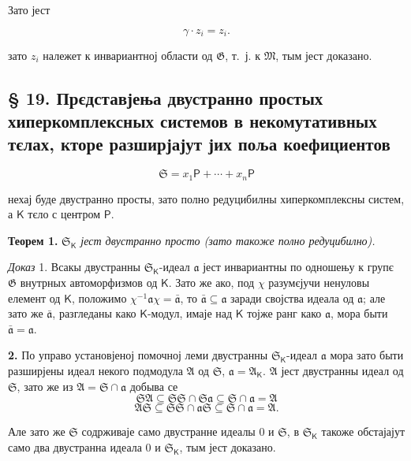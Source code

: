 \documentclass[11pt]{article}
\begin{document}
Зато јест

\[
\gamma\cdot z_i=z_i.
\]

зато \(z_i\) належет к инвариантној области од \(\mathfrak G\), т.~ј. к \(\mathfrak M\), тым јест доказано.

\subsection*{§ 19. Прєдставјења двустранно простых хиперкомплексных системов в некомутативных тєлах, кторе разширјајут јих поља коефициентов}\label{darstellungen-zweiseitig-einfacher-hyperkomplexer-systeme-in-nichtkommutativen-erweiterungskoerpern-ihrer-koeffizientenkoerper}

\[
\mathfrak S=x_1\mathsf P+\cdots+x_n\mathsf P
\]

нехај буде двустранно просты, зато полно редуцибилны хиперкомплексны систем, а \(\mathsf K\) тєло с центром \(\mathsf P\).

\textbf{Теорем 1.} \emph{\(\mathfrak S_{\mathsf K}\) јест двустранно просто (зато такоже полно редуцибилно).}

\emph{Доказ} 1. Всакы двустранны \(\mathfrak S_{\mathsf K}\)-идеал \(\mathfrak a\) јест инвариантны по одношењу к групє \(\mathfrak G\) внутрных автоморфизмов од \(\mathsf K\). Зато же ако, под \(\chi\) разумєјучи ненуловы елемент од \(\mathsf K\), положимо \(\chi^{-1}\mathfrak a\chi=\bar{\mathfrak a}\), то \(\bar{\mathfrak a}\subseteq\mathfrak a\) заради својства идеала од \(\mathfrak a\); але зато же \(\bar{\mathfrak a}\), разгледаны како \(\mathsf K\)-модул, имаје над \(\mathsf K\) тојже ранг како \(\mathfrak a\), мора быти \(\bar{\mathfrak a}=\mathfrak a\).

\textbf{2.} По управо установјеној помочној леми двустранны \(\mathfrak S_{\mathsf K}\)-идеал \(\mathfrak a\) мора зато быти разширјены идеал некого подмодула \(\mathfrak A\) од \(\mathfrak S\), \(\mathfrak a=\mathfrak A_{\mathsf K}\). \(\mathfrak A\) јест двустранны идеал од \(\mathfrak S\), зато же из \(\mathfrak A=\mathfrak S\cap\mathfrak a\) добыва се
\[
\mathfrak S\mathfrak A\subseteq\mathfrak S\mathfrak S\cap\mathfrak S\mathfrak a\subseteq\mathfrak S\cap\mathfrak a=\mathfrak A
\]
\[
\mathfrak A\mathfrak S\subseteq\mathfrak S\mathfrak S\cap\mathfrak a\mathfrak S\subseteq\mathfrak S\cap\mathfrak a=\mathfrak A.
\]

Але зато же \(\mathfrak S\) содрживаје само двустранне идеалы 0 и \(\mathfrak S\), в \(\mathfrak S_{\mathsf K}\) такоже обстајајут само два двустранна идеала 0 и \(\mathfrak S_{\mathsf K}\), тым јест доказано.
\end{document}
